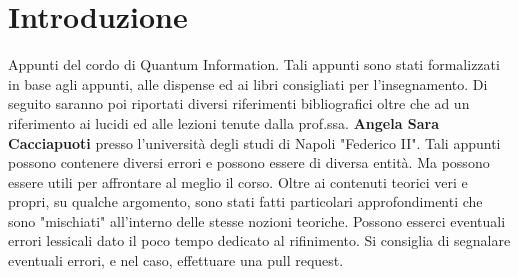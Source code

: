 \chapter*{Introduzione}

Appunti del cordo di Quantum Information. Tali appunti sono stati formalizzati in base agli appunti, alle dispense ed ai libri consigliati per l'insegnamento. Di seguito saranno poi riportati diversi riferimenti bibliografici oltre che ad un riferimento ai lucidi ed alle lezioni tenute dalla prof.ssa. \textbf{Angela Sara Cacciapuoti} presso l'università degli studi di Napoli "Federico II". 
Tali appunti possono contenere diversi errori e possono essere di diversa entità. Ma possono essere utili per affrontare al meglio il corso. Oltre ai contenuti teorici veri e propri, su qualche argomento, sono stati fatti particolari approfondimenti che sono "mischiati" all'interno delle stesse nozioni teoriche. Possono esserci eventuali errori lessicali dato il poco tempo dedicato al rifinimento. Si consiglia di segnalare eventuali errori, e nel caso, effettuare una pull request. 